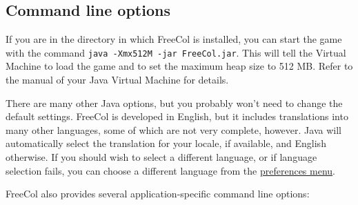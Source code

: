 \documentclass[12pt]{book}
\begin{document}
\hypertarget{Command line options}{\subsection{Command line options}}

If you are in the directory in which FreeCol is installed, you can
start the game with the command \verb$java -Xmx512M -jar FreeCol.jar$.
This will tell the Virtual Machine to load the game and to set the
maximum heap size to 512 MB. Refer to the manual of your Java Virtual
Machine for details.

There are many other Java options, but you probably won't need to
change the default settings. FreeCol is developed in English, but it
includes translations into many other languages, some of which are
not very complete, however. Java will automatically select the
translation for your locale, if available, and English otherwise. If
you should wish to select a different language, or if language
selection fails, you can choose a different language from the
\hyperlink{client options}{preferences menu}.

FreeCol also provides several application-specific command line
options:
\end{document}

